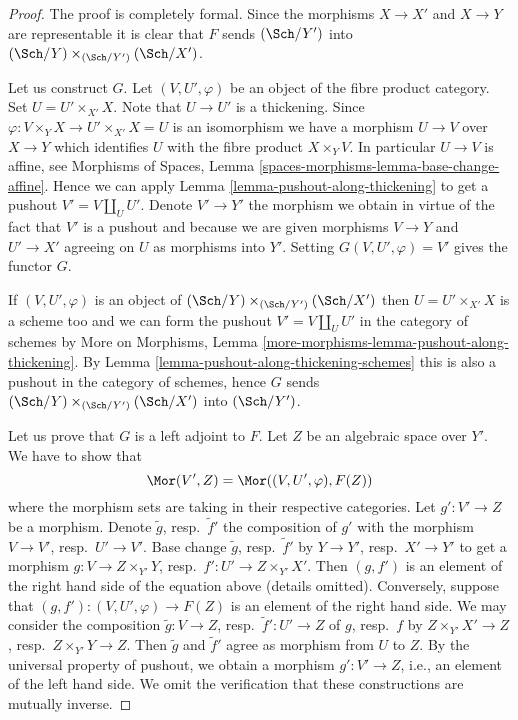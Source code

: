 \begin{proof}
The proof is completely formal.
Since the morphisms $X \to X'$ and $X \to Y$ are representable it
is clear that $F$ sends $(\Sch/Y')$ into
$(\Sch/Y) \times_{(\Sch/Y')} (\Sch/X')$.

\medskip\noindent
Let us construct $G$. Let $(V, U', \varphi)$ be an object of the fibre
product category. Set $U = U' \times_{X'} X$. Note that $U \to U'$ is a
thickening. Since $\varphi : V \times_Y X \to U' \times_{X'} X = U$ is an
isomorphism we have a morphism $U \to V$ over $X \to Y$ which identifies
$U$ with the fibre product $X \times_Y V$. In particular $U \to V$ is
affine, see
Morphisms of Spaces, Lemma \ref{spaces-morphisms-lemma-base-change-affine}.
Hence we can apply Lemma \ref{lemma-pushout-along-thickening}
to get a pushout $V' = V \amalg_U U'$. Denote $V' \to Y'$ the morphism
we obtain in virtue of the fact that $V'$ is a pushout and because
we are given morphisms $V \to Y$ and $U' \to X'$ agreeing on $U$
as morphisms into $Y'$. Setting $G(V, U', \varphi) = V'$
gives the functor $G$.

\medskip\noindent
If $(V, U', \varphi)$ is an object of $(\Sch/Y) \times_{(\Sch/Y')} (\Sch/X')$
then $U = U' \times_{X'} X$ is a scheme too and we can form the pushout
$V' = V \amalg_U U'$ in the category of schemes by
More on Morphisms, Lemma \ref{more-morphisms-lemma-pushout-along-thickening}.
By Lemma \ref{lemma-pushout-along-thickening-schemes}
this is also a pushout in the category of schemes, hence
$G$ sends $(\Sch/Y) \times_{(\Sch/Y')} (\Sch/X')$ into $(\Sch/Y')$.

\medskip\noindent
Let us prove that $G$ is a left adjoint to $F$. Let $Z$ be an algebraic space
over $Y'$. We have to show that
$$
\Mor(V', Z) = \Mor((V, U', \varphi), F(Z))
$$
where the morphism sets are taking in their respective categories.
Let $g' : V' \to Z$ be a morphism. Denote $\tilde g$, resp.\ $\tilde f'$
the composition of $g'$ with the morphism $V \to V'$, resp.\ $U' \to V'$.
Base change $\tilde g$, resp.\ $\tilde f'$ by $Y \to Y'$, resp.\ $X' \to Y'$
to get a morphism $g : V \to Z \times_{Y'} Y$,
resp.\ $f' : U' \to Z \times_{Y'} X'$. Then $(g, f')$ is an element
of the right hand side of the equation above (details omitted).
Conversely, suppose that $(g, f') : (V, U', \varphi) \to F(Z)$ is an
element of the right hand side.
We may consider the composition $\tilde g : V \to Z$,
resp.\ $\tilde f' : U' \to Z$ of $g$, resp.\ $f$ by
$Z \times_{Y'} X' \to Z$, resp.\ $Z \times_{Y'} Y \to Z$.
Then $\tilde g$ and $\tilde f'$ agree as morphism from $U$ to $Z$.
By the universal property of pushout, we obtain a morphism
$g' : V' \to Z$, i.e., an element of the left hand side.
We omit the verification that these constructions are mutually inverse.
\end{proof}

